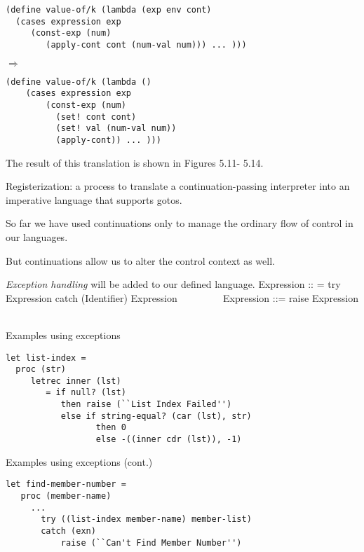 \documentclass{article}
\begin{document}
\begin{huge}
\begin{lstlisting}
(define value-of/k (lambda (exp env cont)
  (cases expression exp
     (const-exp (num) 
        (apply-cont cont (num-val num))) ... )))
\end{lstlisting}
$\Rightarrow$
\begin{lstlisting}
(define value-of/k (lambda ()
    (cases expression exp
        (const-exp (num)
          (set! cont cont)
          (set! val (num-val num))
          (apply-cont)) ... )))
\end{lstlisting}

The result of this translation is shown in Figures 5.11- 5.14. \al


Registerization: a process to translate a continuation-passing interpreter into an imperative language that supports gotos.


So far we have used continuations only to manage the ordinary flow of control in our languages.

But continuations allow us to alter the control context as well. 

{\it Exception handling} will be added to our defined language. \al
Expression :: = try Expression catch (Identifier) Expression \al
\ \ \ \ \ \ \ \   \al
Expression ::= raise Expression\al
\ \ \ \ \ \ \ \   



Examples using exceptions

\begin{lstlisting}
let list-index = 
  proc (str) 
     letrec inner (lst)
        = if null? (lst) 
           then raise (``List Index Failed'')
           else if string-equal? (car (lst), str) 
                  then 0
                  else -((inner cdr (lst)), -1)
\end{lstlisting}


Examples using exceptions (cont.)

\begin{lstlisting}
let find-member-number =
   proc (member-name)
     ...
       try ((list-index member-name) member-list)
       catch (exn)
           raise (``Can't Find Member Number'')
\end{lstlisting}


\end{huge}
\end{document}
